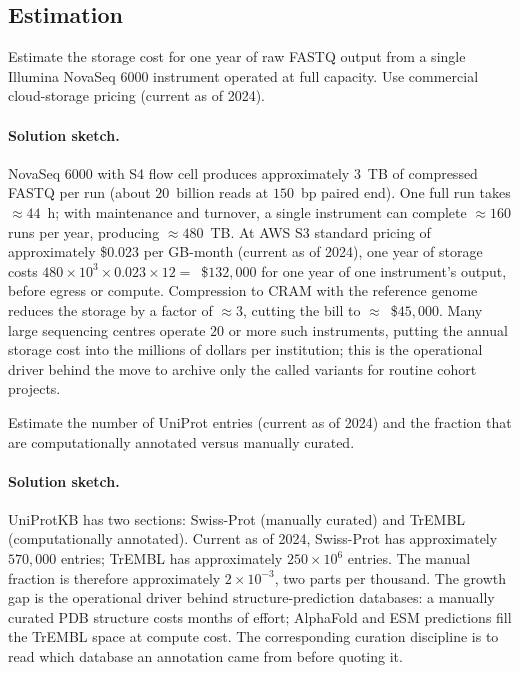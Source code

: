 \subsection*{Estimation}

\begin{exercise}
Estimate the storage cost for one year of raw FASTQ output from a
single Illumina NovaSeq 6000 instrument operated at full capacity.
Use commercial cloud-storage pricing (current as of 2024).

\paragraph{Solution sketch.}
NovaSeq 6000 with S4 flow cell produces approximately $3$~TB
of compressed FASTQ per run (about $20$~billion reads at $150$~bp
paired end). One full run takes $\approx 44$~h; with maintenance and
turnover, a single instrument can complete $\approx 160$ runs per year,
producing $\approx 480$~TB. At AWS S3 standard pricing of approximately
\$0.023 per GB-month (current as of 2024), one year of storage costs
$480 \times 10^{3} \times 0.023 \times 12 = $~\$$132{,}000$ for one
year of one instrument's output, before egress or compute. Compression
to CRAM with the reference genome reduces the storage by a factor of
$\approx 3$, cutting the bill to $\approx$~\$$45{,}000$. Many large
sequencing centres operate $20$ or more such instruments, putting the
annual storage cost into the millions of dollars per institution;
this is the operational driver behind the move to archive only the
called variants for routine cohort projects.
\end{exercise}

\begin{exercise}
Estimate the number of UniProt entries (current as of 2024) and the
fraction that are computationally annotated versus manually curated.

\paragraph{Solution sketch.}
UniProtKB has two sections: Swiss-Prot (manually curated) and TrEMBL
(computationally annotated). Current as of 2024, Swiss-Prot has
approximately $570{,}000$ entries; TrEMBL has approximately $250 \times
10^{6}$ entries. The manual fraction is therefore approximately
$2 \times 10^{-3}$, two parts per thousand. The growth gap is the
operational driver behind structure-prediction databases: a manually
curated PDB structure costs months of effort; AlphaFold and ESM
predictions fill the TrEMBL space at compute cost. The corresponding
curation discipline is to read which database an annotation came from
before quoting it.
\end{exercise}

